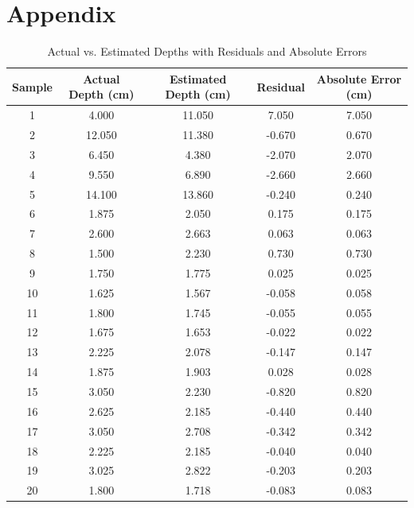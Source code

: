 %
%
%                 

\chapter{Appendix}
\label{sec:appendixa}

\begin{table}[H]
	\centering
	\caption{Actual vs. Estimated Depths with Residuals and Absolute Errors}
	\begin{tabular}{|c|c|c|c|c|}
		\hline
		\textbf{Sample} & \textbf{Actual Depth (cm)} & \textbf{Estimated Depth (cm)} & \textbf{Residual} & \textbf{Absolute Error (cm)} \\
		\hline
		1 & 4.000 & 11.050 & 7.050 & 7.050 \\
		2 & 12.050 & 11.380 & -0.670 & 0.670 \\
		3 & 6.450 & 4.380 & -2.070 & 2.070 \\
		4 & 9.550 & 6.890 & -2.660 & 2.660 \\
		5 & 14.100 & 13.860 & -0.240 & 0.240 \\
		6 & 1.875 & 2.050 & 0.175 & 0.175 \\
		7 & 2.600 & 2.663 & 0.063 & 0.063 \\
		8 & 1.500 & 2.230 & 0.730 & 0.730 \\
		9 & 1.750 & 1.775 & 0.025 & 0.025 \\
		10 & 1.625 & 1.567 & -0.058 & 0.058 \\
		11 & 1.800 & 1.745 & -0.055 & 0.055 \\
		12 & 1.675 & 1.653 & -0.022 & 0.022 \\
		13 & 2.225 & 2.078 & -0.147 & 0.147 \\
		14 & 1.875 & 1.903 & 0.028 & 0.028 \\
		15 & 3.050 & 2.230 & -0.820 & 0.820 \\
		16 & 2.625 & 2.185 & -0.440 & 0.440 \\
		17 & 3.050 & 2.708 & -0.342 & 0.342 \\
		18 & 2.225 & 2.185 & -0.040 & 0.040 \\
		19 & 3.025 & 2.822 & -0.203 & 0.203 \\
		20 & 1.800 & 1.718 & -0.083 & 0.083 \\

\end{tabular}
\end{table}
